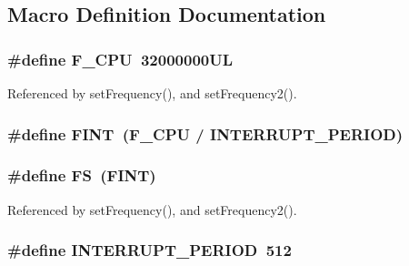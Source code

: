 \subsection{Macro Definition Documentation}
\hypertarget{~main_8c_a43bafb28b29491ec7f871319b5a3b2f8}{
\subsubsection[{F\-\_\-\-C\-P\-U}]{\setlength{\rightskip}{0pt plus 5cm}\#define F\-\_\-\-C\-P\-U~32000000\-U\-L}}\label{~main_8c_a43bafb28b29491ec7f871319b5a3b2f8}


Referenced by set\-Frequency(), and set\-Frequency2().

\hypertarget{~main_8c_abef1196c18f992aa76600b2fd4535bf9}{
\subsubsection[{F\-I\-N\-T}]{\setlength{\rightskip}{0pt plus 5cm}\#define F\-I\-N\-T~({\bf F\-\_\-\-C\-P\-U} / {\bf I\-N\-T\-E\-R\-R\-U\-P\-T\-\_\-\-P\-E\-R\-I\-O\-D})}}\label{~main_8c_abef1196c18f992aa76600b2fd4535bf9}
\hypertarget{~main_8c_a30588c5eca7c9cb6ebba02a0236f0119}{
\subsubsection[{F\-S}]{\setlength{\rightskip}{0pt plus 5cm}\#define F\-S~({\bf F\-I\-N\-T})}}\label{~main_8c_a30588c5eca7c9cb6ebba02a0236f0119}


Referenced by set\-Frequency(), and set\-Frequency2().

\hypertarget{~main_8c_a533f998159de957b1f91e571cda46b9c}{
\subsubsection[{I\-N\-T\-E\-R\-R\-U\-P\-T\-\_\-\-P\-E\-R\-I\-O\-D}]{\setlength{\rightskip}{0pt plus 5cm}\#define I\-N\-T\-E\-R\-R\-U\-P\-T\-\_\-\-P\-E\-R\-I\-O\-D~512}}\label{~main_8c_a533f998159de957b1f91e571cda46b9c}



